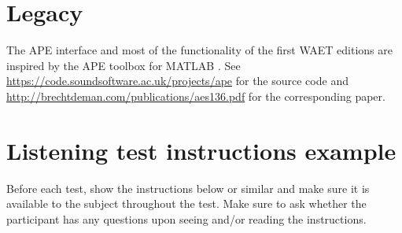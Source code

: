 \documentclass[11pt, oneside]{article}   	%
\begin{document}
\clearpage

{}


\clearpage
\appendix

\section{Legacy}
	The APE interface and most of the functionality of the first WAET editions are inspired by the APE toolbox for MATLAB \cite{ape}. See \url{https://code.soundsoftware.ac.uk/projects/ape} for the source code and \url{http://brechtdeman.com/publications/aes136.pdf} for the corresponding paper. 

\clearpage

\section{Listening test instructions example}

	Before each test, show the instructions below or similar and make sure it is available to the subject throughout the test. Make sure to ask whether the participant has any questions upon seeing and/or reading the instructions. 
			
\end{document}
